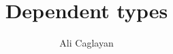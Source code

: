\documentclass[usenames,dvipsnames]{beamer}
\title{Dependent types}
\author{Ali Caglayan}
\institute{University of Bath}
\newcommand{\blu}[1]{\textcolor{blue}{#1}}
\newcommand{\gre}[1]{\textcolor{ForestGreen}{#1}}
\newcommand{\red}[1]{\textcolor{red}{#1}}
\newcommand{\yel}[1]{\textcolor{violet}{#1}}
\begin{document}
    \frame{\titlepage}
    
    
    
    
    
    
    
\end{document}
